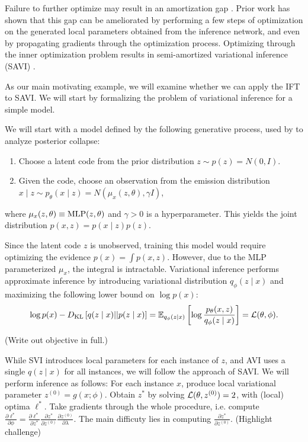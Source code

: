 \documentclass[11pt]{article}
\begin{document}
Failure to further optimize may result in an amortization gap \citep{}.
Prior work has shown that this gap can be ameliorated by performing a few steps of
optimization on the generated local parameters obtained from the inference network,
and even by propagating gradients through the optimization process.
Optimizing through the inner optimization problem results in semi-amortized variational inference
(SAVI) \citep{}.

As our main motivating example, we will examine whether we can apply the IFT to SAVI.
We will start by formalizing the problem of variational inference for a simple model.

We will start with a model defined by the following generative process,
used by \citet{dai2020vae} to analyze posterior collapse:
\begin{enumerate}
\item Choose a latent code from the prior distribution $z \sim p(z) = N(0, I)$.
\item Given the code, choose an observation from the emission distribution
    $x \mid z \sim p_\theta(x \mid z) = N(\mu_x(z, \theta), \gamma I)$,
\end{enumerate}
where $\mu_x(z, \theta) \equiv \mathrm{MLP}(z, \theta)$ and $\gamma > 0$ is a hyperparameter.
This yields the joint distribution $p(x,z) = p(x\mid z)p(z)$.

Since the latent code $z$ is unobserved, training this model would require optimizing the
evidence $p(x) = \int p(x,z)$.
However, due to the MLP parameterized $\mu_x$, the integral is intractable.
Variational inference performs approximate inference by introducing variational distribution
$q_\phi(z \mid x)$ and maximizing the following lower bound on $\log p(x)$:
\begin{equation}
    \log p(x) - D_\mathrm{KL}\left[q(z \mid x) || p(z \mid x)\right]
    = \mathbb{E}_{q_\phi(z \mid x)}\left[\log \frac{p_\theta(x,z)}{q_\phi(z\mid x)}\right] = \mathcal{L}(\theta, \phi).
\end{equation}

(Write out objective in full.)

While SVI introduces local parameters for each instance of $z$,
and AVI uses a single $q(z \mid x)$ for all instances,
we will follow the approach of SAVI.
We will perform inference as follows:
For each instance $x$, produce local variational parameter
$z^{(0)} = g(x; \phi)$.
Obtain $z^*$ by solving $\mathcal{L}(\theta, z^{(0)}) = 2$, with (local) optima $\ell^*$.
Take gradients through the whole procedure,
i.e. compute $\frac{\partial \ell^*}{\partial \phi}
= \frac{\partial\ell^*}{\partial z^*}\frac{\partial z^*}{\partial z^{(0)}}
\frac{\partial z^{(0)}}{\partial \lambda}$.
The main difficuty lies in computing $\frac{\partial z^*}{\partial z^{(0)}}$.
(Highlight challenge)
\end{document}
